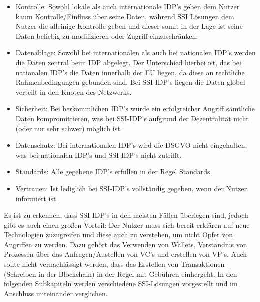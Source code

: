 \begin{itemize}
	\item Kontrolle: Sowohl lokale als auch internationale IDP's geben dem Nutzer kaum Kontrolle/Einfluss über seine Daten, während SSI Lösungen dem Nutzer die alleinige Kontrolle geben und dieser somit in der Lage ist seine Daten beliebig zu modifizieren oder Zugriff einzuschränken.
	
	\item Datenablage: Sowohl bei internationalen als auch bei nationalen IDP's werden die Daten zentral beim IDP abgelegt. Der Unterschied hierbei ist, das bei nationalen IDP's die Daten innerhalb der EU liegen, da diese an rechtliche Rahmenbedingungen gebunden sind. Bei SSI-IDP's liegen die Daten global verteilt in den Knoten des Netzwerks.
	
	\item Sicherheit: Bei herkömmlichen IDP's würde ein erfolgreicher Angriff sämtliche Daten kompromittieren, was bei SSI-IDP's aufgrund der Dezentralität nicht (oder nur sehr schwer) möglich ist.
	
	\item Datenschutz: Bei internationalen IDP's wird die DSGVO nicht eingehalten, was bei nationalen IDP's und SSI-IDP's nicht zutrifft.
	
	\item Standards: Alle gegebene IDP's erfüllen in der Regel Standards.
	
	\item Vertrauen: Ist lediglich bei SSI-IDP's vollständig gegeben, wenn der Nutzer informiert ist.  
\end{itemize}

Es ist zu erkennen, dass SSI-IDP's in den meisten Fällen überlegen sind, jedoch gibt es auch einen großen Vorteil: Der Nutzer muss sich bereit erklären auf neue Technologien zuzugreifen und diese auch zu verstehen, um nicht Opfer von Angriffen zu werden. Dazu gehört das Verwenden von Wallets, Verständnis von Prozessen über das Anfragen/Austellen von VC's und erstellen von VP's. Auch sollte nicht vernachlässigt werden, dass das Erstellen von Transaktionen (Schreiben in der Blockchain) in der Regel mit Gebühren einhergeht. In den folgenden Subkapiteln werden verschiedene SSI-Lösungen vorgestellt und im Anschluss miteinander verglichen.

